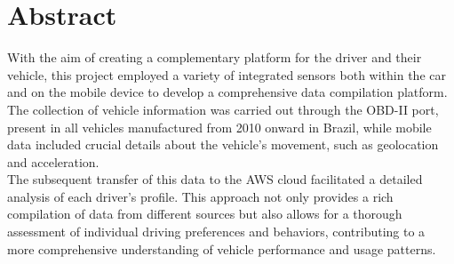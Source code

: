 \chapter*{Abstract}


\noindent With the aim of creating a complementary platform for the driver and their vehicle, this project employed a variety of integrated sensors both within the car and on the mobile device to develop a comprehensive data compilation platform.\\
The collection of vehicle information was carried out through the OBD-II port, present in all vehicles manufactured from 2010 onward in Brazil, while mobile data included crucial details about the vehicle's movement, such as geolocation and acceleration.\\
The subsequent transfer of this data to the AWS cloud facilitated a detailed analysis of each driver's profile. This approach not only provides a rich compilation of data from different sources but also allows for a thorough assessment of individual driving preferences and behaviors, contributing to a more comprehensive understanding of vehicle performance and usage patterns.

